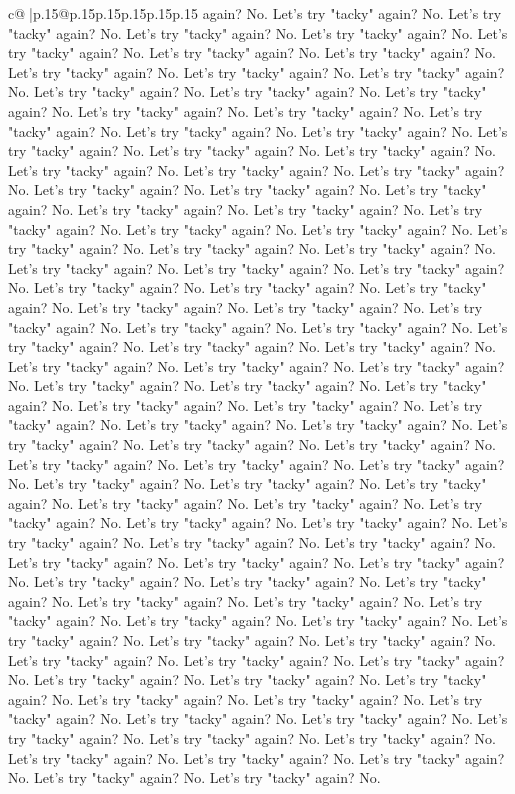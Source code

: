 \documentclass{article}
\begin{document}
{\begin{supertabular}{c@{$\;$}|p{.15\linewidth}@{}p{.15\linewidth}p{.15\linewidth}p{.15\linewidth}p{.15\linewidth}p{.15\linewidth}}
{{{again? No. Let's try "tacky" again? No. Let's try "tacky" again? No. Let's try "tacky" again? No. Let's try "tacky" again? No. Let's try "tacky" again? No. Let's try "tacky" again? No. Let's try "tacky" again? No. Let's try "tacky" again? No. Let's try "tacky" again? No. Let's try "tacky" again? No. Let's try "tacky" again? No. Let's try "tacky" again? No. Let's try "tacky" again? No. Let's try "tacky" again? No. Let's try "tacky" again? No. Let's try "tacky" again? No. Let's try "tacky" again? No. Let's try "tacky" again? No. Let's try "tacky" again? No. Let's try "tacky" again? No. Let's try "tacky" again? No. Let's try "tacky" again? No. Let's try "tacky" again? No. Let's try "tacky" again? No. Let's try "tacky" again? No. Let's try "tacky" again? No. Let's try "tacky" again? No. Let's try "tacky" again? No. Let's try "tacky" again? No. Let's try "tacky" again? No. Let's try "tacky" again? No. Let's try "tacky" again? No. Let's try "tacky" again? No. Let's try "tacky" again? No. Let's try "tacky" again? No. Let's try "tacky" again? No. Let's try "tacky" again? No. Let's try "tacky" again? No. Let's try "tacky" again? No. Let's try "tacky" again? No. Let's try "tacky" again? No. Let's try "tacky" again? No. Let's try "tacky" again? No. Let's try "tacky" again? No. Let's try "tacky" again? No. Let's try "tacky" again? No. Let's try "tacky" again? No. Let's try "tacky" again? No. Let's try "tacky" again? No. Let's try "tacky" again? No. Let's try "tacky" again? No. Let's try "tacky" again? No. Let's try "tacky" again? No. Let's try "tacky" again? No. Let's try "tacky" again? No. Let's try "tacky" again? No. Let's try "tacky" again? No. Let's try "tacky" again? No. Let's try "tacky" again? No. Let's try "tacky" again? No. Let's try "tacky" again? No. Let's try "tacky" again? No. Let's try "tacky" again? No. Let's try "tacky" again? No. Let's try "tacky" again? No. Let's try "tacky" again? No. Let's try "tacky" again? No. Let's try "tacky" again? No. Let's try "tacky" again? No. Let's try "tacky" again? No. Let's try "tacky" again? No. Let's try "tacky" again? No. Let's try "tacky" again? No. Let's try "tacky" again? No. Let's try "tacky" again? No. Let's try "tacky" again? No. Let's try "tacky" again? No. Let's try "tacky" again? No. Let's try "tacky" again? No. Let's try "tacky" again? No. Let's try "tacky" again? No. Let's try "tacky" again? No. Let's try "tacky" again? No. Let's try "tacky" again? No. Let's try "tacky" again? No. Let's try "tacky" again? No. Let's try "tacky" again? No. Let's try "tacky" again? No. Let's try "tacky" again? No. Let's try "tacky" again? No. Let's try "tacky" again? No. Let's try "tacky" again? No. Let's try "tacky" again? No. Let's try "tacky" again? No. Let's try "tacky" again? No. Let's try "tacky" again? No. Let's try "tacky" again? No. Let's try "tacky" again? No. Let's try "tacky" again? No. Let's try "tacky" again? No. Let's try "tacky" again? No. Let's try "tacky" again? No. Let's try "tacky" again? No. Let's try "tacky" again? No. Let's try "tacky" again? No. Let's try "tacky" again? No. Let's try "tacky" again? No. Let's try "tacky" again? No. Let's try "tacky" again? No. Let's try "tacky" again? No. }}}
\end{supertabular}}
\end{document}

